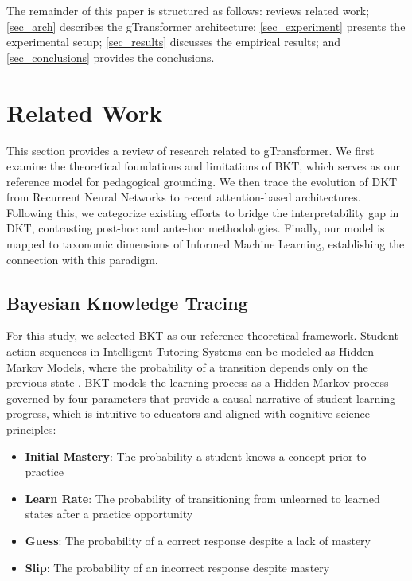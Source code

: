 \documentclass[applsci,article,submit,moreauthors,pdftex]{Definitions/mdpi}
\begin{document}
The remainder of this paper is structured as follows:  reviews related work; \cref{sec_arch} describes the gTransformer architecture; \cref{sec_experiment} presents the experimental setup; \cref{sec_results} discusses the empirical results; and \cref{sec_conclusions} provides the conclusions. 

\section{Related Work} \label{sec_related}

This section provides a review of research related to gTransformer. We first examine the theoretical foundations and limitations of BKT, which serves as our reference model for pedagogical grounding. We then trace the evolution of DKT from Recurrent Neural Networks to recent attention-based architectures. Following this, we categorize existing efforts to bridge the interpretability gap in DKT, contrasting post-hoc and ante-hoc methodologies. Finally, our model is mapped to taxonomic dimensions of Informed Machine Learning, establishing the connection with this paradigm. 


\subsection{Bayesian Knowledge Tracing} \label{sec_bkt}

For this study, we selected BKT \citep{corbett1994knowledge} as our reference theoretical framework. Student action sequences in Intelligent Tutoring Systems can be modeled as Hidden Markov Models, where the probability of a transition depends only on the previous state \citep{Arnau-Gonzalez2025195}. BKT models the learning process as a Hidden Markov process governed by four parameters that provide a causal narrative of student learning progress, which is intuitive to educators and aligned with cognitive science principles:

\begin{itemize}
    \item \textbf{Initial Mastery}: The probability a student knows a concept prior to practice 
    \item \textbf{Learn Rate}: The probability of transitioning from unlearned to learned states after a practice opportunity
    \item \textbf{Guess}: The probability of a correct response despite a lack of mastery
    \item \textbf{Slip}: The probability of an incorrect response despite mastery 
\end{itemize}
\end{document}
